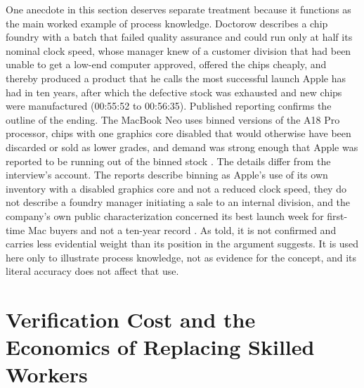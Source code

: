 \documentclass[12pt]{article}
\newcommand{\ts}[1]{(#1)}
\begin{document}
One anecdote in this section deserves separate treatment because it functions as the main worked example of process knowledge. Doctorow describes a chip foundry with a batch that failed quality assurance and could run only at half its nominal clock speed, whose manager knew of a customer division that had been unable to get a low-end computer approved, offered the chips cheaply, and thereby produced a product that he calls the most successful launch Apple has had in ten years, after which the defective stock was exhausted and new chips were manufactured \ts{00:55:52 to 00:56:35}. Published reporting confirms the outline of the ending. The MacBook Neo uses binned versions of the A18 Pro processor, chips with one graphics core disabled that would otherwise have been discarded or sold as lower grades, and demand was strong enough that Apple was reported to be running out of the binned stock \cite{macrumors,macworld}. The details differ from the interview's account. The reports describe binning as Apple's use of its own inventory with a disabled graphics core and not a reduced clock speed, they do not describe a foundry manager initiating a sale to an internal division, and the company's own public characterization concerned its best launch week for first-time Mac buyers and not a ten-year record \cite{macrumors}. As told, it is not confirmed and carries less evidential weight than its position in the argument suggests. It is used here only to illustrate process knowledge, not as evidence for the concept, and its literal accuracy does not affect that use.

\section{Verification Cost and the Economics of Replacing Skilled Workers}
\end{document}
